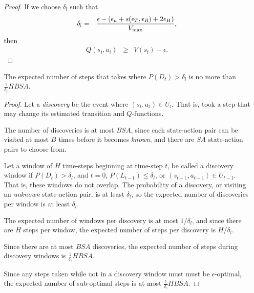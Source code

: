 \begin{proof}
If we choose $\delta_l$ such that
\begin{eqnarray}
\delta_l &=& \frac {\epsilon - (\epsilon_u + s(\epsilon_T,\epsilon_R) +2 \epsilon_H)} {V_{\rm max}},
\end{eqnarray}
then 
\begin{eqnarray}
Q(s_t,a_t) &\geq& V(s_t) - \epsilon.
\end{eqnarray}

\end{proof}

\begin{lemma}
\label{sec:pacmdp:lemma:bad-steps}
The expected number of steps that \A takes where $P(D_t) > \delta_l$ is no more than $\frac 1 {\delta_l} H B S A $.
\end{lemma}

\begin{proof}
Let a \emph{discovery} be the event where $(s_t,a_t) \in U_t$. That is, \A took a step that may change its estimated transition and $Q$-functions.

The number of discoveries is at most $B S A$, since each state-action pair can be visited at most $B$ times before it becomes \emph{known}, and there are $S A$ state-action pairs to choose from.

Let a window of $H$ time-steps beginning at time-step $t$, be called a discovery window if $P(D_t) > \delta_l$, and $t=0$, $P(L_{t-1}) \leq \delta_l$, or $(s_{t-1},a_{t-1}) \in U_{t-1}$. That is, these windows do not overlap. The probability of a discovery, or visiting an \emph{unknown} state-action pair, is at least $\delta_l$, so the expected number of discoveries per window is at least $\delta_l$.

The expected number of windows per discovery is at most $1/\delta_l$, and since there are $H$ steps per window, the expected number of steps per discovery is $H / \delta_l$.

Since there are at most $B S A$ discoveries, the expected number of steps during discovery windows is $\frac 1 {\delta_l} H B S A$.

Since any steps taken while not in a discovery window must must be $\epsilon$-optimal, the expected number of sub-optimal steps is at most $\frac 1 {\delta_l} H B S A$.

\end{proof}
